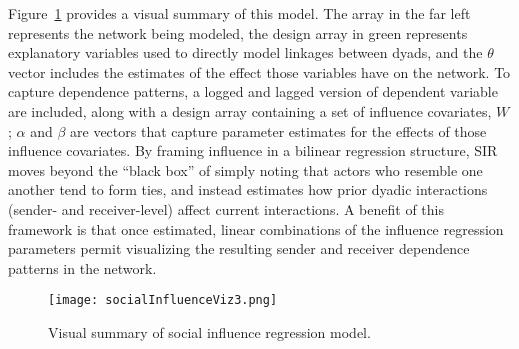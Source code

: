 Figure~\ref{fig:socialInfluenceViz} provides a visual summary of this model. The array in the far left represents the network being modeled, the design array in green represents explanatory variables used to directly model linkages between dyads, and the $\theta$ vector includes the estimates of the effect those variables have on the network. To capture dependence patterns, a logged and lagged version of dependent variable are included, along with a design array containing a set of influence covariates, $W$; $\alpha$ and $\beta$ are vectors that capture parameter estimates for the effects of those influence covariates. By framing influence in a bilinear regression structure, SIR moves beyond the ``black box'' of simply noting that actors who resemble one another tend to form ties, and instead estimates how prior dyadic interactions (sender- and receiver-level) affect current interactions. A benefit of this framework is that once  estimated, linear combinations of the influence regression parameters permit visualizing the resulting sender and receiver dependence patterns in the network. 

\begin{figure}[ht]
	\texttt{[image: socialInfluenceViz3.png]}
	\caption{Visual summary of social influence regression model.}
	\label{fig:socialInfluenceViz}
\end{figure}
